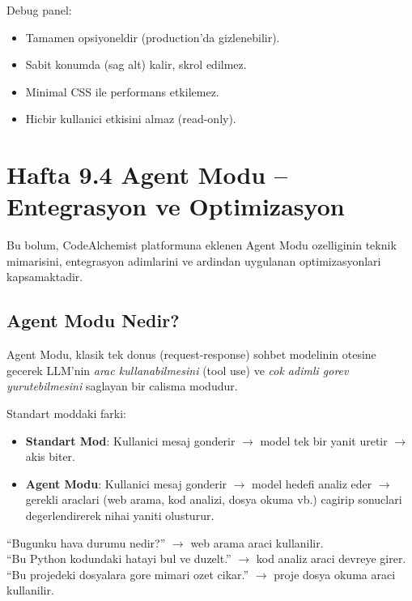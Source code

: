 \documentclass[11pt,a4paper]{article}
\begin{document}
{Debug panel:
\begin{itemize}[leftmargin=1.5em]
	\item Tamamen opsiyoneldir (production'da gizlenebilir).
	\item Sabit konumda (sag alt) kalir, skrol edilmez.
	\item Minimal CSS ile performans etkilemez.
	\item Hicbir kullanici etkisini almaz (read-only).
\end{itemize}


\section{Hafta 9.4 Agent Modu -- Entegrasyon ve Optimizasyon}

Bu bolum, CodeAlchemist platformuna eklenen Agent Modu ozelliginin teknik mimarisini, entegrasyon adimlarini ve ardindan uygulanan optimizasyonlari kapsamaktadir.

\subsection{Agent Modu Nedir?}

Agent Modu, klasik tek donus (request-response) sohbet modelinin otesine gecerek LLM'nin \textit{arac kullanabilmesini} (tool use) ve \textit{cok adimli gorev yurutebilmesini} saglayan bir calisma modudur.

Standart moddaki farki:
\begin{itemize}[leftmargin=1.5em]
    \item \textbf{Standart Mod}: Kullanici mesaj gonderir $\rightarrow$ model tek bir yanit uretir $\rightarrow$ akis biter.
    \item \textbf{Agent Modu}: Kullanici mesaj gonderir $\rightarrow$ model hedefi analiz eder $\rightarrow$ gerekli araclari (web arama, kod analizi, dosya okuma vb.) cagirip sonuclari degerlendirerek nihai yaniti olusturur.
\end{itemize}

\begin{notebox}
``Bugunku hava durumu nedir?'' $\rightarrow$ web arama araci kullanilir.\\
``Bu Python kodundaki hatayi bul ve duzelt.'' $\rightarrow$ kod analiz araci devreye girer.\\
``Bu projedeki dosyalara gore mimari ozet cikar.'' $\rightarrow$ proje dosya okuma araci kullanilir.
\end{notebox}

}
\end{document}

